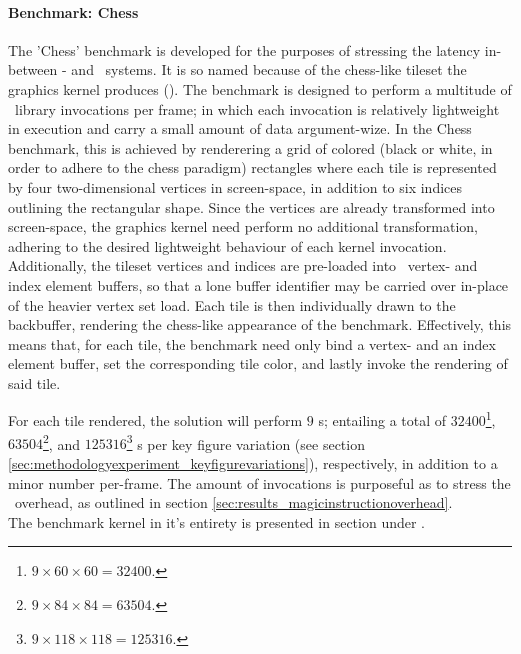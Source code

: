 \paragraph{Benchmark: Chess}
\label{par:methodologyexperiment_benchmarking_benchmarkchess}
The 'Chess' benchmark is developed for the purposes of stressing the latency in-between \dvttermtarget - and \dvttermhost\ systems.
It is so named because of the chess-like tileset the graphics kernel produces ().
The benchmark is designed to perform a multitude of \dvttermopenglestwopointo\ library invocations per frame; in which each invocation is relatively lightweight in execution and carry a small amount of data argument-wize.
In the Chess benchmark, this is achieved by renderering a grid of colored (black or white, in order to adhere to the chess paradigm) rectangles where each tile is represented by four two-dimensional vertices in screen-space, in addition to six indices outlining the rectangular shape.
Since the vertices are already transformed into screen-space, the graphics kernel need perform no additional transformation, adhering to the desired lightweight behaviour of each kernel invocation.
Additionally, the tileset vertices and indices are pre-loaded into \dvttermopengl\ vertex- and index element buffers, so that a lone buffer identifier may be carried over in-place of the heavier vertex set load.
Each tile is then individually drawn to the backbuffer, rendering the chess-like appearance of the benchmark.
Effectively, this means that, for each tile, the benchmark need only bind a vertex- and an index element buffer, set the corresponding tile color, and lastly invoke the rendering of said tile.

For each tile rendered, the solution will perform $9$ \dvttermmagicinstruction s; entailing a total of $32400$\footnote{$9\times60\times60=32400$.}, $63504$\footnote{$9\times84\times84=63504$.}, and $125316$\footnote{$9\times118\times118=125316$.} \dvttermmagicinstruction s per key figure variation (see section \ref{sec:methodologyexperiment_keyfigurevariations}), respectively, in addition to a minor number  per-frame.
The amount of invocations is purposeful as to stress the \dvttermmagicinstruction\ overhead, as outlined in section \ref{sec:results_magicinstructionoverhead}.\\

\noindent
The benchmark kernel in it's entirety is presented in section  under .

